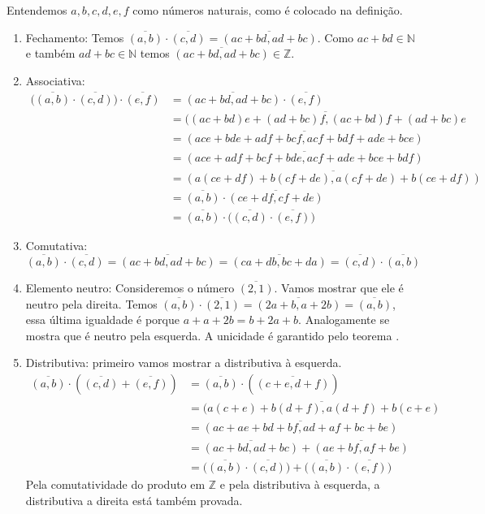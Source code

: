 \documentclass[../main.tex]{subfiles}
\begin{document}
\begin{dem}
    Entendemos $a,b,c,d,e,f$ como números naturais, como é colocado na definição.
    \begin{enumerate}[label=(\roman*)]
        \item Fechamento:
        Temos $\overline{(a,b)} \cdot \overline{(c,d)} = \overline{(ac+bd, ad+bc)}$. Como $ac+bd \in \mathbb{N}$ e também $ad+bc \in \mathbb{N}$ temos $\overline{(ac+bd, ad+bc)} \in \mathbb{Z}$.

        \item Associativa: 
        \begin{align*}
            \big(\overline{(a,b)} \cdot \overline{(c,d)}\big) \cdot  \overline{(e,f)} &= \overline{(ac+bd, ad+bc)} \cdot \overline{(e,f)} \\
            &= \overline{((ac+bd)e + (ad+bc)f , (ac+bd)f + (ad+bc)e} \\
            &= \overline{(ace+bde+adf+bcf, acf+bdf+ade+bce)} \\
            &= \overline{(ace+adf+bcf+bde, acf+ade+bce+bdf)} \\
            &= \overline{(a(ce+df) + b(cf+de) , a(cf+de) + b(ce+df))} \\
            &= \overline{(a,b)} \cdot \overline{(ce+df, cf+de)} \\
            &= \overline{(a,b)} \cdot \big( \overline{(c,d)} \cdot \overline{(e,f)} \big)
        \end{align*}
        
        
        \item Comutativa: 
        $\overline{(a,b)} \cdot \overline{(c,d)} = \overline{(ac+bd, ad+bc)} =
        \overline{(ca+db, bc+da)} = \overline{(c,d)} \cdot \overline{(a,b)}$
            
        
        \item Elemento neutro: Consideremos o número $\overline{(2,1)}$. Vamos mostrar que ele é neutro pela direita. Temos $\overline{(a,b)} \cdot \overline{(2,1)} = \overline{(2a+b, a+2b)} = \overline{(a,b)}$, essa última igualdade é porque $a + a + 2b = b + 2a + b$. Analogamente se mostra que é neutro pela esquerda. A unicidade é garantido pelo teorema .
        
        \item Distributiva: primeiro vamos mostrar a distributiva à esquerda.
        \begin{align*}
            \overline{(a,b)} \cdot \left( \overline{(c,d)} + \overline{(e,f)} \right) &= \overline{(a,b)} \cdot (\overline{(c+e,d+f)}) \\
            &= \overline{(a(c+e) + b(d+f), a(d+f) +b(c+e)} \\
            &= \overline{(ac+ae+bd+bf, ad+af+bc+be)} \\
            &= \overline{(ac+bd, ad+bc)} + \overline{(ae+bf, af+be)} \\
            &= \big( \overline{(a,b)} \cdot \overline{(c,d)} \big) + \big( \overline{(a,b)} \cdot \overline{(e,f)} \big)    
        \end{align*}
        Pela comutatividade do produto em $\mathbb{Z}$ e pela distributiva à esquerda, a distributiva a direita está também provada.


\end{enumerate}
\end{dem}
\end{document}
